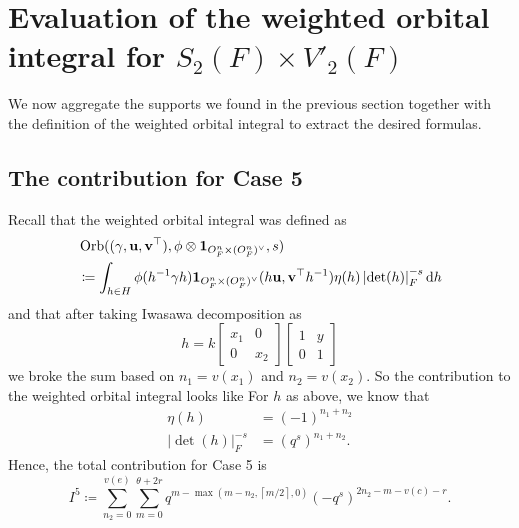 \chapter{Evaluation of the weighted orbital integral for $S_2(F) \times V'_2(F)$}
\label{ch:orbitalFJ2}

We now aggregate the supports we found in the previous section together with the
definition of the weighted orbital integral to extract the desired formulas.

\section{The contribution for Case 5}
Recall that the weighted orbital integral was defined as
\begin{align*}
  & \Orb(\guv, \phi \otimes \oneV, s) \\
  &\coloneqq
  \int_{h \in H} \phi(h\inv \gamma h)
  \oneV(h \uu, \vv^\top h^{-1})
  \eta(h) \left\lvert \det(h) \right\rvert_F^{-s} \odif h
\end{align*}
and that after taking Iwasawa decomposition as
\[ h = k \begin{bmatrix} x_1 & 0 \\ 0 & x_2 \end{bmatrix}
  \begin{bmatrix} 1 & y \\ 0 & 1 \end{bmatrix} \]
we broke the sum based on $n_1 = v(x_1)$ and $n_2 = v(x_2)$.
So the contribution to the weighted orbital integral looks like
For $h$ as above, we know that
\begin{align*}
  \eta(h) &= (-1)^{n_1 + n_2} \\
  \left\lvert \det(h) \right\rvert_F^{-s} &= (q^s)^{n_1 + n_2}.
\end{align*}
Hence, the total contribution for Case 5 is
\[
  I^{\text{5}} \coloneqq \sum_{n_2 = 0}^{v(e)} \sum_{m = 0}^{\theta + 2r}
  q^{m - \max\left( m-n_2, \left\lceil m/2 \right\rceil, 0 \right)}
  (-q^s)^{2n_2 - m - v(c) - r}.
\]

